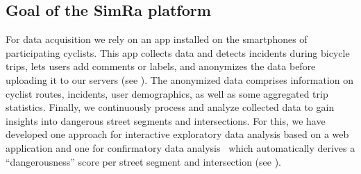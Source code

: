 \subsection{Goal of the SimRa platform}
\label{subsec:simra}

For data acquisition we rely on an app installed on the smartphones of participating cyclists.
This app collects data and detects incidents during bicycle trips, lets users add comments or labels, and anonymizes the data before uploading it to our servers (see ).
The anonymized data comprises information on cyclist routes, incidents, user demographics, as well as some aggregated trip statistics.
Finally, we continuously process and analyze collected data to gain insights into dangerous street segments and intersections.
For this, we have developed one approach for interactive exploratory data analysis based on a web application and one for confirmatory data analysis~\cite{bermbach2017cloud} which automatically derives a ``dangerousness'' score per street segment and intersection (see ).

